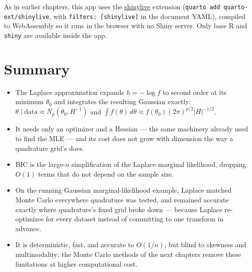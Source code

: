 \documentclass[
  letterpaper,
  DIV=11,
  numbers=noendperiod]{scrreprt}
\providecommand{\tightlist}{%
  \setlength{\itemsep}{0pt}\setlength{\parskip}{0pt}}
\begin{document}
\begin{tcolorbox}[enhanced jigsaw, arc=.35mm, bottomrule=.15mm, bottomtitle=1mm, breakable, colback=white, colbacktitle=quarto-callout-note-color!10!white, colframe=quarto-callout-note-color-frame, coltitle=black, left=2mm, leftrule=.75mm, opacityback=0, opacitybacktitle=0.6, rightrule=.15mm, title=\textcolor{quarto-callout-note-color}{\faInfo}\hspace{0.5em}{Reproducing this figure}, titlerule=0mm, toprule=.15mm, toptitle=1mm]

As in earlier chapters, this app uses the
\href{https://github.com/quarto-ext/shinylive}{shinylive} extension
(\texttt{quarto\ add\ quarto-ext/shinylive}, with
\texttt{filters:\ {[}shinylive{]}} in the document YAML), compiled to
WebAssembly so it runs in the browser with no Shiny server. Only base R
and \texttt{shiny} are available inside the app.

\end{tcolorbox}

\section{Summary}\label{summary-3}

\begin{itemize}
\tightlist
\item
  The Laplace approximation expands \(h=-\log f\) to second order at its
  minimum \(\theta_0\) and integrates the resulting Gaussian exactly:
  \(\theta\mid\text{data} \approx N_p(\theta_0, H^{-1})\) and
  \(\int f(\theta)\,d\theta \approx f(\theta_0)(2\pi)^{p/2}|H|^{-1/2}\).
\item
  It needs only an optimizer and a Hessian --- the same machinery
  already used to find the MLE --- and its cost does not grow with
  dimension the way a quadrature grid's does.
\item
  BIC is the large-\(n\) simplification of the Laplace marginal
  likelihood, dropping \(O(1)\) terms that do not depend on the sample
  size.
\item
  On the running Gaussian marginal-likelihood example, Laplace matched
  Monte Carlo everywhere quadrature was tested, and remained accurate
  exactly where quadrature's fixed grid broke down --- because Laplace
  re-optimizes for every dataset instead of committing to one transform
  in advance.
\item
  It is deterministic, fast, and accurate to \(O(1/n)\), but blind to
  skewness and multimodality; the Monte Carlo methods of the next
  chapters remove these limitations at higher computational cost.
\end{itemize}
\end{document}
